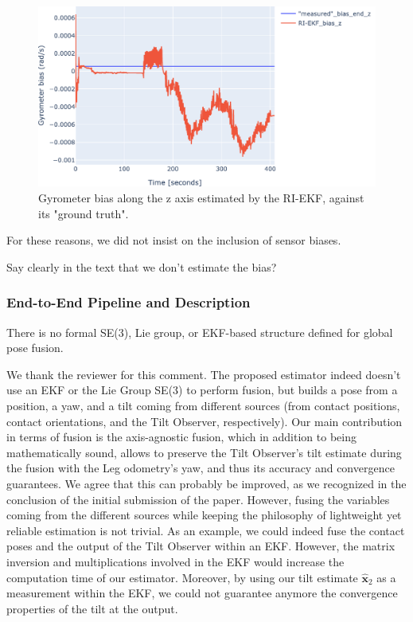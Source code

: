 \begin{figure}[!ht]
\begin{center}
\includegraphics[width=\textwidth]{bias_z.pdf} 
\vskip -0.5pc
\caption{Gyrometer bias along the z axis estimated by the RI-EKF, against its "ground truth".}\label{fig:bias}
\end{center}
\vskip -1.5pc
\end{figure}

For these reasons, we did not insist on the inclusion of sensor biases.


\alert{Say clearly in the text that we don't estimate the bias?}

 

\subsubsection{End-to-End Pipeline and Description}




\begin{revquote}\hypertarget{CommentSe3Fusion}{}
There is no formal SE(3), Lie group, or EKF-based structure defined for global pose fusion.
\end{revquote}


We thank the reviewer for this comment. The proposed estimator indeed doesn't use an EKF or the Lie Group SE(3) to perform fusion, but builds a pose from a position, a yaw, and a tilt coming from different sources (from contact positions, contact orientations, and the Tilt Observer, respectively). Our main contribution in terms of fusion is the axis-agnostic fusion, which in addition to being mathematically sound, allows to preserve the Tilt Observer's tilt estimate during the fusion with the Leg odometry's yaw, and thus its accuracy and convergence guarantees. We agree that this can probably be improved, as we recognized in the conclusion of the initial submission of the paper. However, fusing the variables coming from the different sources while keeping the philosophy of lightweight yet reliable estimation is not trivial. 
As an example, we could indeed fuse the contact poses and the output of the Tilt Observer within an EKF. However, the matrix inversion and multiplications involved in the EKF would increase the computation time of our estimator. Moreover, by using our tilt estimate $\hat{\boldsymbol{x}}_{2}$ as a measurement within the EKF, we could not guarantee anymore the convergence properties of the tilt at the output.

